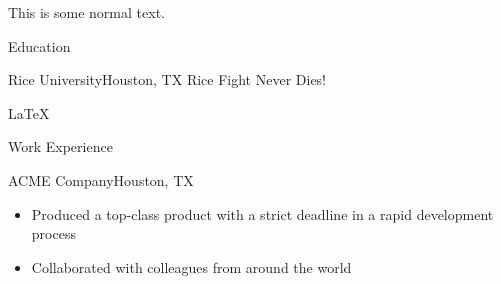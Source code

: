 \documentclass{resume-cwf}
\author{Carson Foster}
\begin{document}
\makeinfo
This is some normal text.\\
\begin{rsection}{Education}
	\begin{rsubsection}{Rice University}{Houston, TX}
	Rice Fight Never Dies!
	\end{rsubsection}

	\LaTeX\\
\end{rsection}

\begin{rsection}{Work Experience}
	\begin{rsubsection}{ACME Company}{Houston, TX}%
		\begin{itemize}
		\item Produced a top-class product with a strict deadline in a rapid development process
		\item Collaborated with colleagues from around the world
		\end{itemize}
	\end{rsubsection}
\end{rsection}
\end{document}
